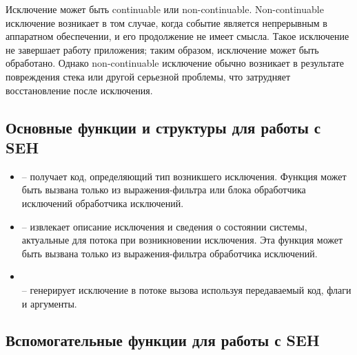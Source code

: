 Исключение может быть continuable или non-continuable. Non-continuable исключение возникает в том случае, когда событие является непрерывным в аппаратном обеспечении, и его продолжение не имеет смысла. Такое исключение не завершает работу приложения; таким образом, исключение может быть обработано. Однако non-continuable исключение обычно возникает в результате повреждения стека или другой серьезной проблемы, что затрудняет восстановление после исключения.

\subsection{Основные функции и структуры для работы с SEH}

\begin{itemize}
	\item {} -- получает код, определяющий тип возникшего исключения. Функция может быть вызвана только из выражения-фильтра или блока обработчика исключений обработчика исключений.
	\item {} -- извлекает описание исключения и сведения о состоянии системы, актуальные для потока при возникновении исключения. Эта функция может быть вызвана только из выражения-фильтра обработчика исключений.
	\item {} \\  -- генерирует исключение в потоке вызова используя передаваемый код, флаги и аргументы.
\end{itemize}

\subsection{Вспомогательные функции для работы с SEH}
\label{sec:utils}


